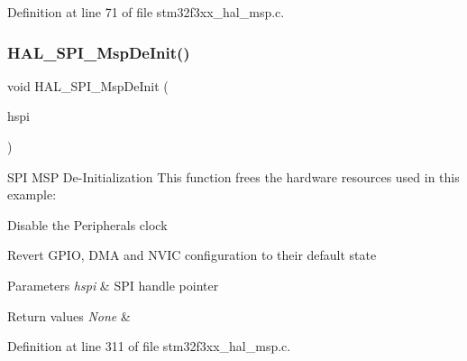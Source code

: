 Definition at line 71 of file stm32f3xx\+\_\+hal\+\_\+msp.\+c.

\mbox{\label{group___h_a_l___m_s_p___private___functions_gabadc4d4974af1afd943e8d13589068e1}} 
\subsubsection{H\+A\+L\+\_\+\+S\+P\+I\+\_\+\+Msp\+De\+Init()}
{\footnotesize\ttfamily void H\+A\+L\+\_\+\+S\+P\+I\+\_\+\+Msp\+De\+Init (\begin{DoxyParamCaption}\item[{S\+P\+I\+\_\+\+Handle\+Type\+Def $\ast$}]{hspi }\end{DoxyParamCaption})}



S\+PI M\+SP De-\/\+Initialization This function frees the hardware resources used in this example\+: 


\begin{DoxyItemize}
\item Disable the Peripheral\textquotesingle{}s clock
\item Revert G\+P\+IO, D\+MA and N\+V\+IC configuration to their default state 
\begin{DoxyParams}{Parameters}
{\em hspi} & S\+PI handle pointer \\
\hline
\end{DoxyParams}

\begin{DoxyRetVals}{Return values}
{\em None} & \\
\hline
\end{DoxyRetVals}

\end{DoxyItemize}

Definition at line 311 of file stm32f3xx\+\_\+hal\+\_\+msp.\+c.

\mbox{\label{group___h_a_l___m_s_p___private___functions_ga17f583be14b22caffa6c4e56dcd035ef}} 
